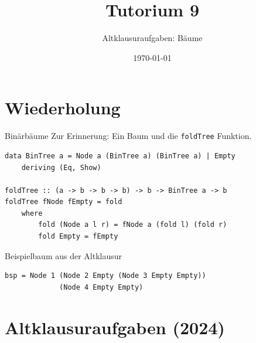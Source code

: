 \documentclass[aspectratio=169,11pt]{beamer}
\title{\textbf{Tutorium 9}}
\subtitle{Altklausuraufgaben: Bäume}
\institute{Grundlagen der Praktischen Informatik}
\author{}
\date{\today}
\begin{document}
\begin{frame}[plain]
    \titlepage
\end{frame}

\section{Wiederholung}

\begin{frame}[fragile]{Binärbäume}
    Zur Erinnerung: Ein Baum und die \texttt{foldTree} Funktion.
    
    \begin{tcolorbox}[modernbox, title=Definition]
\begin{lstlisting}
data BinTree a = Node a (BinTree a) (BinTree a) | Empty
    deriving (Eq, Show)

foldTree :: (a -> b -> b -> b) -> b -> BinTree a -> b
foldTree fNode fEmpty = fold
    where
        fold (Node a l r) = fNode a (fold l) (fold r)
        fold Empty = fEmpty
\end{lstlisting}
    \end{tcolorbox}
\end{frame}


\begin{frame}[fragile]{Beispielbaum aus der Altklausur}
    \begin{tcolorbox}[modernbox, title=\texttt{bsp} Baum]
\begin{lstlisting}
bsp = Node 1 (Node 2 Empty (Node 3 Empty Empty)) 
             (Node 4 Empty Empty)
\end{lstlisting}
    \end{tcolorbox}
    
    \begin{center}
    \end{center}
\end{frame}

\section{Altklausuraufgaben (2024)}
\end{document}
